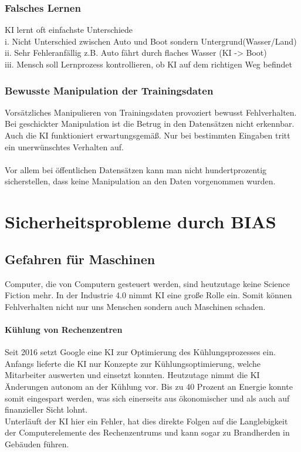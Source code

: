 \documentclass[12pt,oneside,a4paper,parskip]{scrbook}
\begin{document}
\subsection{Falsches Lernen}
KI lernt oft einfachste Unterschiede
\\i.	Nicht Unterschied zwischen Auto und Boot sondern Untergrund(Wasser/Land)
\\ii.	Sehr Fehleranfällig z.B. Auto fährt durch flaches Wasser (KI -> Boot)
\\iii. 	Mensch soll Lernprozess kontrollieren, ob KI auf dem richtigen Weg befindet
\subsection{Bewusste Manipulation der Trainingsdaten}
Vorsätzliches Manipulieren von Trainingsdaten provoziert bewusst Fehlverhalten. Bei geschickter Manipulation ist die Betrug in den Datensätzen nicht erkennbar. Auch die KI funktioniert erwartungsgemäß. Nur bei bestimmten Eingaben tritt ein unerwünschtes Verhalten auf. \\\\
Vor allem bei öffentlichen Datensätzen kann man nicht hundertprozentig sicherstellen, dass keine Manipulation an den Daten vorgenommen wurden.

\chapter{Sicherheitsprobleme durch BIAS}

\section{Gefahren für Maschinen}
Computer, die von Computern gesteuert werden, sind heutzutage keine Science Fiction mehr. In der Industrie 4.0 nimmt KI eine große Rolle ein. Somit können Fehlverhalten nicht nur uns Menschen sondern auch Maschinen schaden.
\subsubsection{Kühlung von Rechenzentren}
Seit 2016 setzt Google eine KI zur Optimierung des Kühlungsprozesses ein. Anfangs lieferte die KI nur Konzepte zur Kühlungsoptimierung, welche Mitarbeiter auswerten und einsetzt konnten. Heutzutage nimmt die KI Änderungen autonom an der Kühlung vor. Bis zu 40 Prozent an Energie konnte somit eingespart werden, was sich einerseits aus ökonomischer und als auch auf finanzieller Sicht lohnt.\\
Unterläuft der KI hier ein Fehler, hat dies direkte Folgen auf die Langlebigkeit der Computerelemente des Rechenzentrums und kann sogar zu Brandherden in Gebäuden führen.
\end{document}
